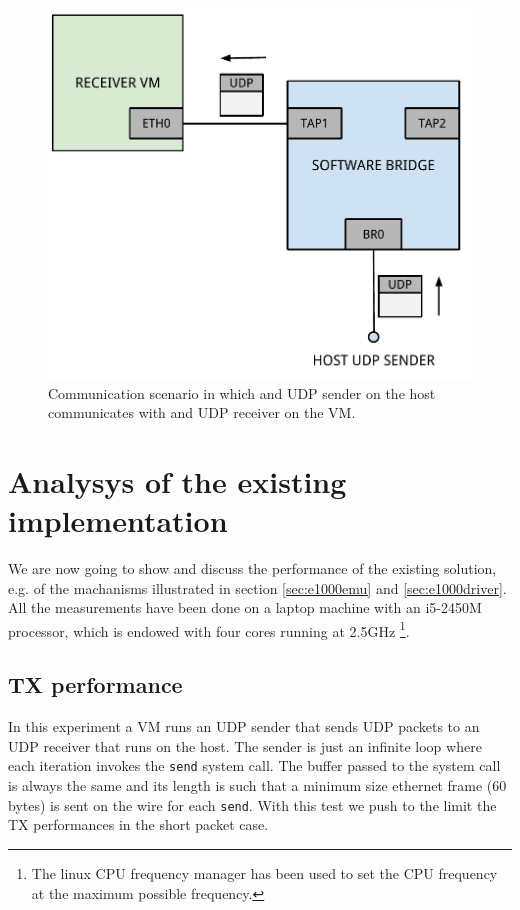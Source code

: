 \begin{figure}[bt]
\centering
\includegraphics[scale = 0.60]{scenario-2.pdf}
\caption{Communication scenario in which and UDP sender on the host communicates with and UDP receiver on the VM.}
\label{fig:scenario-2}
\end{figure}


\section{Analysys of the existing implementation}
\label{sec:e1000perf}
We are now going to show and discuss the performance of the existing solution, e.g. of the machanisms illustrated in section 
\ref{sec:e1000emu} and \ref{sec:e1000driver}.
All the measurements have been done on a laptop machine with an i5-2450M processor, which is endowed with four cores running at 2.5GHz
\footnote{The linux CPU frequency manager has been used to set the CPU frequency at the maximum possible frequency.}.

\subsection{TX performance}
\label{sec:e1000txperf}
In this experiment a VM runs an UDP sender that sends UDP packets to an UDP receiver that runs on the host. The sender is just an 
infinite loop where each iteration invokes the \texttt{send} system call. The buffer passed to the system call is always the same and its
length is such that a minimum size ethernet frame (60 bytes) is sent on the wire for each \texttt{send}.
With this test we push to the limit the TX performances in the short packet case.


